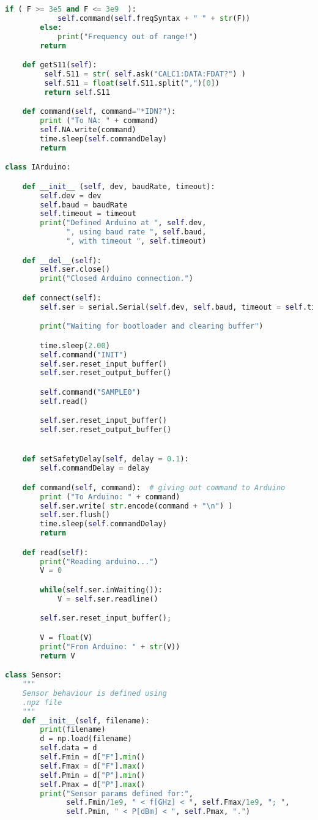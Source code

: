 \begin{lstlisting}[language=Python]
        if ( F >= 3e5 and F <= 3e9  ):
            self.command(self.freqSyntax + " " + str(F))
        else:
            print("Frequency out of range!")
        return

    def getS11(self):
         self.S11 = str( self.ask("CALC1:DATA:FDAT?") )
         self.S11 = float(self.S11.split(",")[0])
         return self.S11

    def command(self, command="*IDN?"):
        print ("To NA: " + command)
        self.NA.write(command)
        time.sleep(self.commandDelay)
        return

class IArduino:

    def __init__ (self, dev, baudRate, timeout):
        self.dev = dev
        self.baud = baudRate
        self.timeout = timeout
        print("Defined Arduino at ", self.dev,
              ", using baud rate ", self.baud,
              ", with timeout ", self.timeout)

    def __del__(self):
        self.ser.close()
        print("Closed Arduino connection.")

    def connect(self):
        self.ser = serial.Serial(self.dev, self.baud, timeout = self.timeout)

        print("Waiting for bootloader and clearing buffer")

        time.sleep(2.00)
        self.command("INIT")
        self.ser.reset_input_buffer()
        self.ser.reset_output_buffer()

        self.command("SAMPLE0")
        self.read()

        self.ser.reset_input_buffer()
        self.ser.reset_output_buffer()


    def setSafetyDelay(self, delay = 0.1):
        self.commandDelay = delay

    def command(self, command):  # giving out command to Arduino
        print ("To Arduino: " + command)
        self.ser.write( str.encode(command + "\n") )
        self.ser.flush()
        time.sleep(self.commandDelay)
        return

    def read(self):
        print("Reading arduino...")
        V = 0

        while(self.ser.inWaiting()):
            V = self.ser.readline()

        self.ser.reset_input_buffer();

        V = float(V)
        print("From Arduino: " + str(V))
        return V

class Sensor:
    """
    Sensor behaviour is defined using
    .npz file
    """
    def __init__(self, filename):
        print(filename)
        d = np.load(filename)
        self.data = d
        self.Fmin = d["F"].min()
        self.Fmax = d["F"].max()
        self.Pmin = d["P"].min()
        self.Pmax = d["P"].max()
        print("Sensor params defined for:",
              self.Fmin/1e9, " < f[GHz] < ", self.Fmax/1e9, "; ",
              self.Pmin, " < P[dBm] < ", self.Pmax, ".")


\end{lstlisting}

